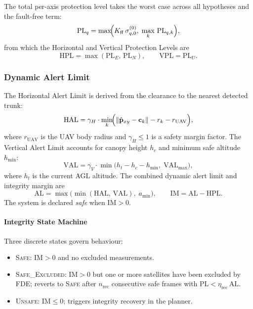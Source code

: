\documentclass[journal]{IEEEtran}
\newcommand{\norm}[1]{\left\|#1\right\|}
\newcommand{\pe}{\mathbf{p}}
\begin{document}
The total per-axis protection level takes the worst case across all
hypotheses and the fault-free term:
\begin{equation}
  \mathrm{PL}_q = \max\!\Bigl(
    K_{\mathrm{ff}}\,\sigma_{q,0}^{(0)},\;
    \max_{k}\,\mathrm{PL}_{q,k}
  \Bigr),
  \label{eq:PL_total}
\end{equation}
from which the Horizontal and Vertical Protection Levels are
\begin{equation}
  \mathrm{HPL} = \max(\mathrm{PL}_E,\,\mathrm{PL}_N), \qquad
  \mathrm{VPL} = \mathrm{PL}_U.
  \label{eq:HPL_VPL}
\end{equation}

\subsubsection{Dynamic Alert Limit}
\label{sec:al}

The Horizontal Alert Limit is derived from the clearance to the
nearest detected trunk:
\begin{equation}
  \mathrm{HAL} = \gamma_H \cdot
    \min_k\!\Bigl(\norm{\hat{\pe}_{xy} - \mathbf{c}_k} - r_k - r_{\mathrm{UAV}}\Bigr),
  \label{eq:hal}
\end{equation}
where $r_{\mathrm{UAV}}$ is the UAV body radius and $\gamma_H \leq 1$ is
a safety margin factor.  The Vertical Alert Limit accounts for canopy
height $h_c$ and minimum safe altitude $h_{\min}$:
\begin{equation}
  \mathrm{VAL} = \gamma_V \cdot
    \min\!\bigl(h_t - h_c - h_{\min},\; \mathrm{VAL}_{\max}\bigr),
  \label{eq:val}
\end{equation}
where $h_t$ is the current AGL altitude.  The combined dynamic alert
limit and integrity margin are
\begin{equation}
  \mathrm{AL} = \max\!\bigl(\min(\mathrm{HAL},\,\mathrm{VAL}),\; a_{\min}\bigr),
  \qquad
  \mathrm{IM} = \mathrm{AL} - \mathrm{HPL}.
  \label{eq:IM}
\end{equation}
The system is declared \emph{safe} when $\mathrm{IM} > 0$.

\paragraph{Integrity State Machine}
Three discrete states govern behaviour:
\begin{itemize}
  \item \textsc{Safe}: $\mathrm{IM} > 0$ and no excluded measurements.
  \item \textsc{Safe\_Excluded}: $\mathrm{IM} > 0$ but one or more
        satellites have been excluded by FDE; reverts to \textsc{Safe}
        after $n_{\mathrm{rec}}$ consecutive safe frames with
        $\mathrm{PL} < \eta_{\mathrm{rec}}\,\mathrm{AL}$.
  \item \textsc{Unsafe}: $\mathrm{IM} \leq 0$; triggers integrity
        recovery in the planner.
\end{itemize}
\end{document}
